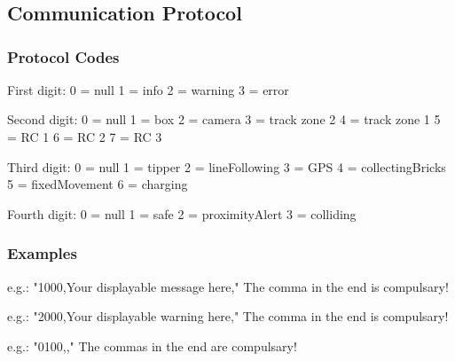 \chapter{}

\section{Communication Protocol}\label{"apx:com_prot"}

\subsection{Protocol Codes}

First digit:
0 = null
1 = info
2 = warning
3 = error

Second digit:
0 = null
1 = box
2 = camera 
3 = track zone 2
4 = track zone 1
5 = RC 1
6 = RC 2
7 = RC 3

Third digit:
0 = null
1 = tipper
2 = lineFollowing 
3 = GPS 
4 = collectingBricks
5 = fixedMovement
6 = charging

Fourth digit:
0 = null
1 = safe
2 = proximityAlert
3 = colliding

\subsection{Examples}

e.g.: "1000,Your displayable message here,"  The comma in the end is compulsary!

e.g.: "2000,Your displayable warning here,"  The comma in the end is compulsary!

e.g.: "0100,,"  The commas in the end are compulsary!